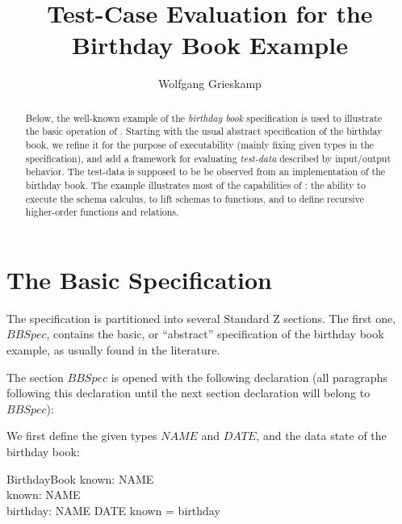 \documentclass{article}
\begin{document}
\author{Wolfgang Grieskamp}
\title{Test-Case Evaluation for the Birthday Book Example}
\maketitle
\begin{abstract}

Below, the well-known example of the \emph{birthday book}
specification is used to illustrate the basic operation of \ZAP.
Starting with the usual abstract specification of the birthday book,
we refine it for the purpose of executability (mainly fixing given
types in the specification), and add a framework for evaluating
\emph{test-data} described by input/output behavior.
The test-data is supposed to be be observed from an
implementation of the birthday book. The example illustrates most
of the capabilities of \ZAP{}: the ability to execute the schema
calculus, to lift schemas to functions, and to define recursive
higher-order functions and relations. 

\end{abstract}




\section{The Basic Specification}

The specification is partitioned into several Standard Z sections. The
first one, $BBSpec$, contains the basic, or ``abstract'' specification
of the birthday book example, as usually found in the literature.

The section $BBSpec$ is opened with the following declaration (all
paragraphs following this declaration until the next section
declaration will belong to $BBSpec$):

\begin{zdirectives} %
\end{zdirectives}

We first define the given types $NAME$ and $DATE$, and the data
state of the birthday book:

\begin{zedgroup} %

\begin{zed}
\end{zed}

\begin{schema}{BirthdayBook}
  known: \power NAME \\
  known: \power NAME \\
  birthday: NAME \pfun DATE
\where
  known = \dom birthday
\end{schema}

\end{zedgroup}
\end{document}
